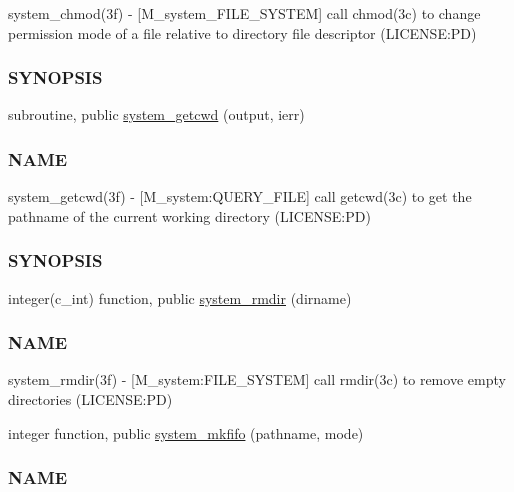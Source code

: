 \begin{DoxyCompactItemize}
\begin{DoxyCompactList}
system\+\_\+chmod(3f) -\/ \mbox{[}M\+\_\+system\+\_\+\+F\+I\+L\+E\+\_\+\+S\+Y\+S\+T\+EM\mbox{]} call chmod(3c) to change permission mode of a file relative to directory file descriptor (L\+I\+C\+E\+N\+SE\+:PD) \subsubsection*{S\+Y\+N\+O\+P\+S\+IS}\end{DoxyCompactList}\item 
subroutine, public \mbox{\hyperlink{namespacem__system_a5a32db818a9ffb0a4ea724e95356c560}{system\+\_\+getcwd}} (output, ierr)
\begin{DoxyCompactList}\small\item\em \subsubsection*{N\+A\+ME}

system\+\_\+getcwd(3f) -\/ \mbox{[}M\+\_\+system\+:Q\+U\+E\+R\+Y\+\_\+\+F\+I\+LE\mbox{]} call getcwd(3c) to get the pathname of the current working directory (L\+I\+C\+E\+N\+SE\+:PD) \subsubsection*{S\+Y\+N\+O\+P\+S\+IS}\end{DoxyCompactList}\item 
integer(c\+\_\+int) function, public \mbox{\hyperlink{namespacem__system_a21fd3e1ccd50cef6adc539ef3d7a9836}{system\+\_\+rmdir}} (dirname)
\begin{DoxyCompactList}\small\item\em \subsubsection*{N\+A\+ME}

system\+\_\+rmdir(3f) -\/ \mbox{[}M\+\_\+system\+:F\+I\+L\+E\+\_\+\+S\+Y\+S\+T\+EM\mbox{]} call rmdir(3c) to remove empty directories (L\+I\+C\+E\+N\+SE\+:PD) \end{DoxyCompactList}\item 
integer function, public \mbox{\hyperlink{namespacem__system_ab2d95258ee26b85a0283538880775475}{system\+\_\+mkfifo}} (pathname, mode)
\begin{DoxyCompactList}\small\item\em \subsubsection*{N\+A\+ME}


\end{DoxyCompactList}
\end{DoxyCompactItemize}
